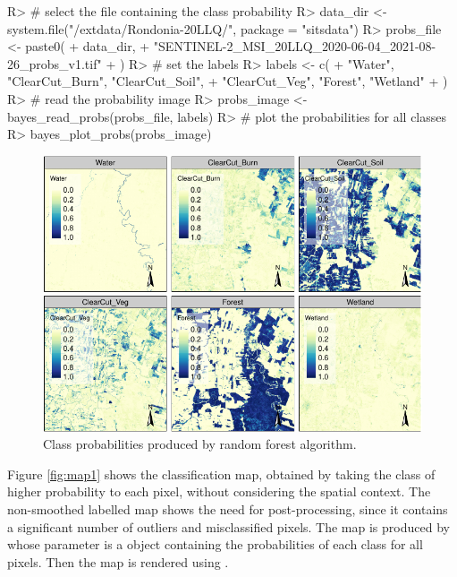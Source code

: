 \documentclass[
  shortnames]{jss}
\begin{document}
\begin{CodeChunk}
\begin{CodeInput}
R> # select the file containing the class probability
R> data_dir <- system.file("/extdata/Rondonia-20LLQ/", package = "sitsdata")
R> probs_file <- paste0(
+   data_dir,
+   "SENTINEL-2_MSI_20LLQ_2020-06-04_2021-08-26_probs_v1.tif"
+ )
R> # set the labels
R> labels <- c(
+   "Water", "ClearCut_Burn", "ClearCut_Soil",
+   "ClearCut_Veg", "Forest", "Wetland"
+ )
R> # read the probability image
R> probs_image <- bayes_read_probs(probs_file, labels)
R> # plot the probabilities for all classes
R> bayes_plot_probs(probs_image)
\end{CodeInput}
\begin{figure}[h]

{\centering \includegraphics{Bayesian_smoothing_JSS_files/figure-latex/pcube-1} 

}

\caption[Class probabilities produced by random forest algorithm]{Class probabilities produced by random forest algorithm.}\label{fig:pcube}
\end{figure}
\end{CodeChunk}

Figure \ref{fig:map1} shows the classification map, obtained by taking the class of higher probability to each pixel, without considering the spatial context. The non-smoothed labelled map shows the need for post-processing, since it contains a significant number of outliers and misclassified pixels. The map is produced by  whose parameter is a  object containing the probabilities of each class for all pixels. Then the map is rendered using .
\end{document}
